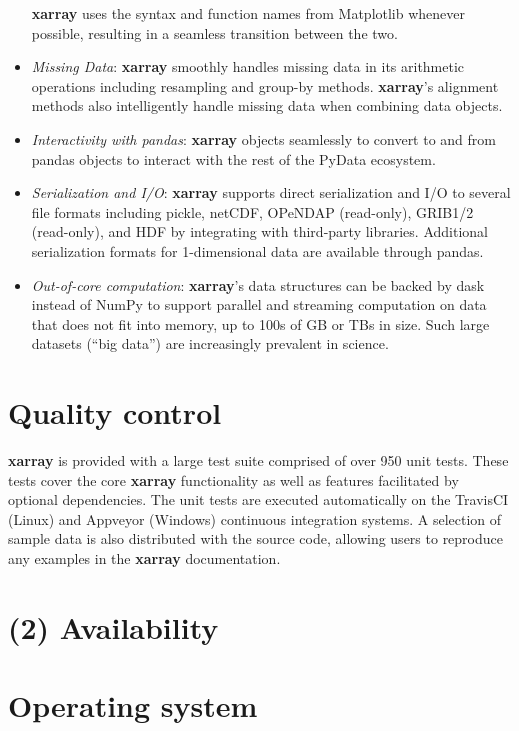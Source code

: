 \documentclass{jors}
\begin{document}
\begin{itemize}
	\textbf{xarray} uses the syntax and function names from Matplotlib whenever possible, resulting in a seamless transition between the two.
	\item \textit{Missing Data}: \textbf{xarray} smoothly handles missing data in its arithmetic operations including resampling and group-by methods. \textbf{xarray}'s alignment methods also intelligently handle missing data when combining data objects.
	\item \textit{Interactivity with pandas}: \textbf{xarray} objects seamlessly to convert to and from pandas objects to interact with the rest of the PyData ecosystem.
	\item \textit{Serialization and I/O}: \textbf{xarray} supports direct serialization and I/O to several file formats including pickle, netCDF, OPeNDAP (read-only), GRIB1/2 (read-only), and HDF by integrating with third-party libraries.
	Additional serialization formats for 1-dimensional data are available through pandas.
	\item \textit{Out-of-core computation}: \textbf{xarray}'s data structures can be backed by dask \cite{dask} instead of NumPy to support parallel and streaming computation on data that does not fit into memory, up to 100s of GB or TBs in size. Such large datasets (``big data'') are increasingly prevalent in science.
\end{itemize}

\section*{Quality control}

\textbf{xarray} is provided with a large test suite comprised of over 950 unit tests.
These tests cover the core \textbf{xarray} functionality as well as features facilitated by optional dependencies.
The unit tests are executed automatically on the TravisCI (Linux) \citep{TravisCI} and Appveyor (Windows) \citep{Appveyor} continuous integration systems.
A selection of sample data is also distributed with the source code, allowing users to reproduce any examples in the \textbf{xarray} documentation.

\section*{(2) Availability}
\vspace{0.5cm}
\section*{Operating system}
\end{document}
